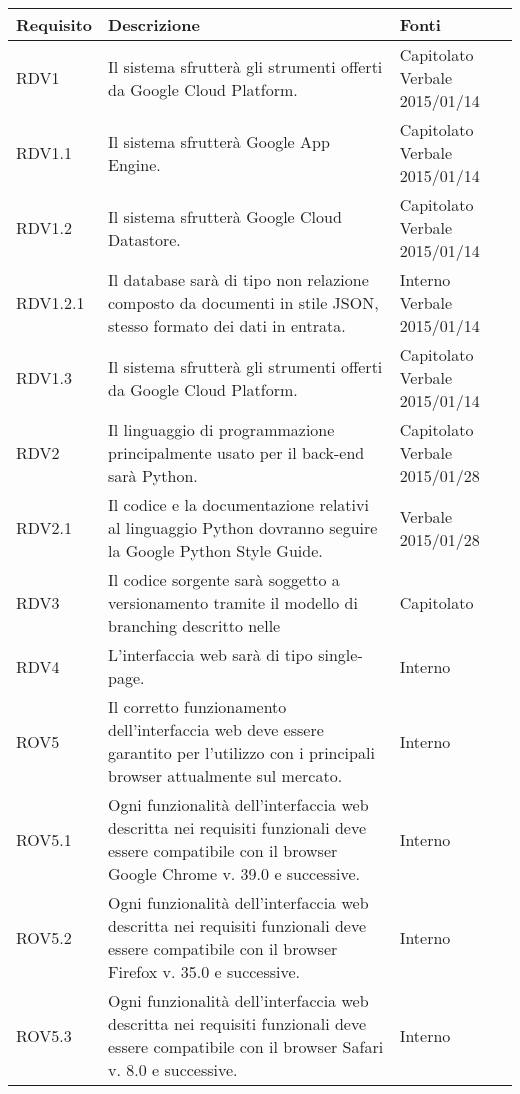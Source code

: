 \begin{center}

	\def\arraystretch{1.5}
	\bgroup
	\begin{longtable}{| p{2.5cm} | p{8cm} | p{2cm} |}

		\hline
		\textbf{Requisito} & \textbf{Descrizione} & \textbf{Fonti} \\
		\hline

		RDV1  &  Il sistema sfrutterà gli strumenti offerti da Google Cloud Platform.  &  Capitolato \newline Verbale 2015/01/14 \\
		\hline
		RDV1.1  &  Il sistema sfrutterà Google App Engine.  &  Capitolato \newline Verbale 2015/01/14 \\
		\hline
		RDV1.2  &  Il sistema sfrutterà Google Cloud Datastore.  &  Capitolato \newline Verbale 2015/01/14 \\
		\hline
		RDV1.2.1  &  Il database sarà di tipo non relazione composto da documenti in stile JSON, stesso formato dei dati in entrata.  &  Interno \newline Verbale 2015/01/14 \\
		\hline
		RDV1.3  &  Il sistema sfrutterà gli strumenti offerti da Google Cloud Platform.  &  Capitolato \newline Verbale 2015/01/14 \\
		\hline

		RDV2  &  Il linguaggio di programmazione principalmente usato per il back-end sarà Python.  &  Capitolato \newline Verbale 2015/01/28 \\
		\hline
		RDV2.1 & Il codice e la documentazione relativi al linguaggio Python dovranno seguire la Google Python Style Guide. & Verbale 2015/01/28 \\
		\hline

		RDV3  &  Il codice sorgente sarà soggetto a versionamento tramite il modello di branching descritto nelle \docNameVersionNdP  &  Capitolato \\
		\hline
		RDV4  &  L'interfaccia web sarà di tipo single-page.  &  Interno \\
		\hline

		ROV5  &  Il corretto funzionamento dell'interfaccia web deve essere garantito per l'utilizzo con i principali browser attualmente sul mercato.   &  Interno \\
		\hline
		ROV5.1  &  Ogni funzionalità dell'interfaccia web descritta nei requisiti funzionali deve essere compatibile con il browser Google Chrome v. 39.0 e successive.   &  Interno \\
		\hline
		ROV5.2  &  Ogni funzionalità dell'interfaccia web descritta nei requisiti funzionali deve essere compatibile con il browser Firefox v. 35.0 e successive.   &  Interno \\
		\hline
		ROV5.3  &  Ogni funzionalità dell'interfaccia web descritta nei requisiti funzionali deve essere compatibile con il browser Safari v. 8.0 e successive.   &  Interno \\
		\hline


\end{longtable}
\end{center}
